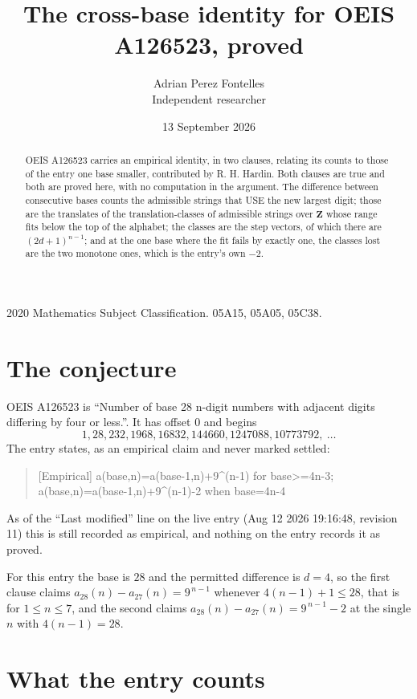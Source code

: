 \documentclass[11pt,a4paper]{article}
\title{The cross-base identity for OEIS A126523, proved}
\author{Adrian Perez Fontelles\\ \small Independent researcher}
\date{13 September 2026}
\theoremstyle{plain}
\theoremstyle{definition}
\begin{document}
\maketitle

\begin{abstract}
OEIS A126523 carries an empirical identity, in two clauses, relating its counts to those of the
entry one base smaller, contributed by R. H. Hardin. Both clauses are true and both are proved
here, with no computation in the argument. The difference between consecutive bases counts the
admissible strings that USE the new largest digit; those are the translates of the
translation-classes of admissible strings over $\mathbf{Z}$ whose range fits below the top of
the alphabet; the classes are the step vectors, of which there are $(2d+1)^{n-1}$; and at the
one base where the fit fails by exactly one, the classes lost are the two monotone ones, which
is the entry's own $-2$.
\end{abstract}

\noindent\small 2020 Mathematics Subject Classification. 05A15, 05A05, 05C38.\normalsize

\section{The conjecture}

OEIS A126523 is ``Number of base 28 n-digit numbers with adjacent digits differing by four or less.''. It has offset $0$ and begins
\[
1, 28, 232, 1968, 16832, 144660, 1247088, 10773792,\ \dots
\]
The entry states, as an empirical claim and never marked settled:
\begin{quote}
[Empirical] a(base,n)=a(base-1,n)+9\textasciicircum{}(n-1) for base>=4n-3; a(base,n)=a(base-1,n)+9\textasciicircum{}(n-1)-2 when base=4n-4
\end{quote}
As of the ``Last modified'' line on the live entry (Aug 12 2026 19:16:48, revision 11)
this is still recorded as empirical, and nothing on the entry records it as proved.

For this entry the base is $28$ and the permitted difference is $d=4$, so the first clause
claims $a_{28}(n)-a_{27}(n)=9^{\,n-1}$ whenever $4(n-1)+1\le28$, that is for
$1\le n\le7$, and the second claims $a_{28}(n)-a_{27}(n)=9^{\,n-1}-2$ at the single
$n$ with $4(n-1)=28$.

\section{What the entry counts}
\end{document}
